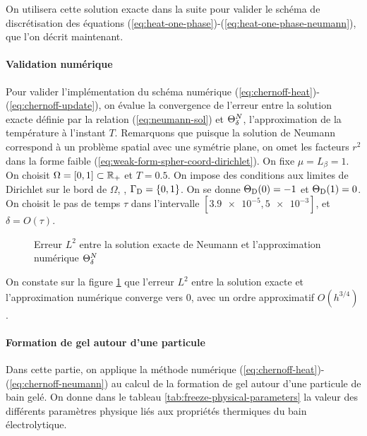 On utilisera cette solution exacte dans la suite pour valider le schéma de
discrétisation des équations
(\ref{eq:heat-one-phase})-(\ref{eq:heat-one-phase-neumann}), que l'on
décrit maintenant.

\paragraph{Validation numérique}
Pour valider l'implémentation du schéma numérique
(\ref{eq:chernoff-heat})-(\ref{eq:chernoff-update}), on évalue la
convergence de l'erreur entre la solution exacte définie par la
relation (\ref{eq:neumann-sol}) et $\Theta^N_\delta$,
l'approximation de la température à l'instant $T$. Remarquons que
puisque la solution de Neumann correspond à un problème spatial avec
une symétrie plane, on omet les facteurs $r^2$ dans la forme faible
(\ref{eq:weak-form-spher-coord-dirichlet}). On fixe $\mu = L_\beta =
1$. On choisit $\Omega = [0, 1] \subset \mathbb R_+$ et $T = 0.5$. On
impose des conditions aux limites de Dirichlet sur le bord de
$\Omega$, \ie, $\Gamma_\mathrm{D} = \left\{ 0, 1 \right\}$. On se donne
$\Theta_\mathrm{D}(0) = -1$ et $\Theta_\mathrm{D}(1) =
0$. On choisit le pas de temps $\tau$ dans l'intervalle
$[\num{3.9e-5}, \num{5e-3}]$, et $\delta = O(\tau)$.

\begin{figure}[h]
  \begin{center}
    
    \caption{Erreur $L^2$ entre la solution exacte de Neumann et
      l'approximation numérique $\Theta^N_\delta$}
    \label{fig:neumann-convergence}
  \end{center}
\end{figure}

On constate sur la figure \ref{fig:neumann-convergence} que l'erreur
$L^2$ entre la solution exacte et l'approximation numérique converge
vers 0, avec un ordre approximatif $O(h^{3/4})$.




\paragraph{Formation de gel autour d'une particule}
Dans cette partie, on applique la méthode numérique
(\ref{eq:chernoff-heat})-(\ref{eq:chernoff-neumann}) au calcul de la
formation de gel autour d'une particule de bain gelé.  On donne dans
le tableau \ref{tab:freeze-physical-parameters} la valeur des
différents paramètres physique liés aux propriétés thermiques du bain
électrolytique.

